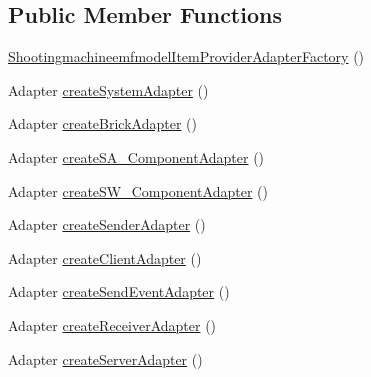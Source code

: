 \subsection*{Public Member Functions}
\begin{DoxyCompactItemize}
\item 
\hyperlink{classshootingmachineemfmodel_1_1provider_1_1_shootingmachineemfmodel_item_provider_adapter_factory_a56b08b209ad1ce09ab861bb07931f830}{Shootingmachineemfmodel\-Item\-Provider\-Adapter\-Factory} ()
\item 
Adapter \hyperlink{classshootingmachineemfmodel_1_1provider_1_1_shootingmachineemfmodel_item_provider_adapter_factory_a549e7cc0cd96495f39476d2ca49ce280}{create\-System\-Adapter} ()
\item 
Adapter \hyperlink{classshootingmachineemfmodel_1_1provider_1_1_shootingmachineemfmodel_item_provider_adapter_factory_acc0aa2547fd5bf8e28d1026f11606dae}{create\-Brick\-Adapter} ()
\item 
Adapter \hyperlink{classshootingmachineemfmodel_1_1provider_1_1_shootingmachineemfmodel_item_provider_adapter_factory_a76dd0b02ca1d688c8c4adec738242e8d}{create\-S\-A\-\_\-\-Component\-Adapter} ()
\item 
Adapter \hyperlink{classshootingmachineemfmodel_1_1provider_1_1_shootingmachineemfmodel_item_provider_adapter_factory_a3eb9d6ae3614709aef354b8455e0cf16}{create\-S\-W\-\_\-\-Component\-Adapter} ()
\item 
Adapter \hyperlink{classshootingmachineemfmodel_1_1provider_1_1_shootingmachineemfmodel_item_provider_adapter_factory_a33a365ffc5dcc01d94019dbd1dfb8ed9}{create\-Sender\-Adapter} ()
\item 
Adapter \hyperlink{classshootingmachineemfmodel_1_1provider_1_1_shootingmachineemfmodel_item_provider_adapter_factory_a0cfd2664d1be927f56ef4ceae95009be}{create\-Client\-Adapter} ()
\item 
Adapter \hyperlink{classshootingmachineemfmodel_1_1provider_1_1_shootingmachineemfmodel_item_provider_adapter_factory_aab8a12e52fec76d83756683b912c33c9}{create\-Send\-Event\-Adapter} ()
\item 
Adapter \hyperlink{classshootingmachineemfmodel_1_1provider_1_1_shootingmachineemfmodel_item_provider_adapter_factory_ab5c01559e8d03f7cca79722fdda456d3}{create\-Receiver\-Adapter} ()
\item 
Adapter \hyperlink{classshootingmachineemfmodel_1_1provider_1_1_shootingmachineemfmodel_item_provider_adapter_factory_a6ca4757fd53a6b88322d29b73a2aeb5c}{create\-Server\-Adapter} ()

\end{DoxyCompactItemize}
